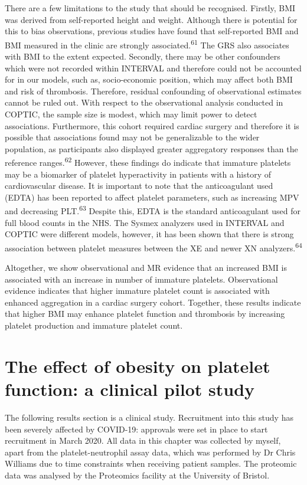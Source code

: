 \documentclass[11pt,twoside]{bristolthesis}
\begin{document}
There are a few limitations to the study that should be recognised. Firstly, BMI was derived from self-reported height and weight. Although there is potential for this to bias observations, previous studies have found that self-reported BMI and BMI measured in the clinic are strongly associated.\textsuperscript{61} The GRS also associates with BMI to the extent expected. Secondly, there may be other confounders which were not recorded within INTERVAL and therefore could not be accounted for in our models, such as, socio-economic position, which may affect both BMI and risk of thrombosis. Therefore, residual confounding of observational estimates cannot be ruled out. With respect to the observational analysis conducted in COPTIC, the sample size is modest, which may limit power to detect associations. Furthermore, this cohort required cardiac surgery and therefore it is possible that associations found may not be generalizable to the wider population, as participants also displayed greater aggregatory responses than the reference ranges.\textsuperscript{62} However, these findings do indicate that immature platelets may be a biomarker of platelet hyperactivity in patients with a history of cardiovascular disease. It is important to note that the anticoagulant used (EDTA) has been reported to affect platelet parameters, such as increasing MPV and decreasing PLT.\textsuperscript{63} Despite this, EDTA is the standard anticoagulant used for full blood counts in the NHS. The Sysmex analyzers used in INTERVAL and COPTIC were different models, however, it has been shown that there is strong association between platelet measures between the XE and newer XN analyzers.\textsuperscript{64}

Altogether, we show observational and MR evidence that an increased BMI is associated with an increase in number of immature platelets. Observational evidence indicates that higher immature platelet count is associated with enhanced aggregation in a cardiac surgery cohort. Together, these results indicate that higher BMI may enhance platelet function and thrombosis by increasing platelet production and immature platelet count.

\hypertarget{BMI-platelets-clinic}{%
\chapter{The effect of obesity on platelet function: a clinical pilot study}\label{BMI-platelets-clinic}}

The following results section is a clinical study. Recruitment into this study has been severely affected by COVID-19: approvals were set in place to start recruitment in March 2020. All data in this chapter was collected by myself, apart from the platelet-neutrophil assay data, which was performed by Dr Chris Williams due to time constraints when receiving patient samples. The proteomic data was analysed by the Proteomics facility at the University of Bristol.
\end{document}
